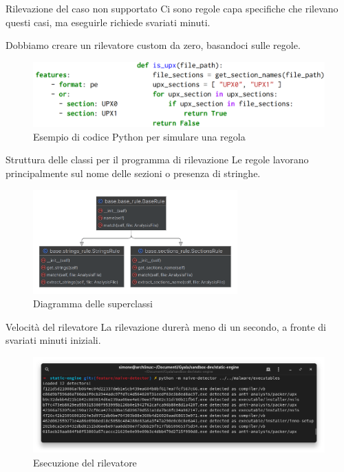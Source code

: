 \begin{frame}{Rilevazione del caso non supportato}
Ci sono regole capa specifiche che rilevano questi casi, ma eseguirle richiede svariati minuti.

Dobbiamo creare un rilevatore custom da zero, basandoci sulle regole.

\begin{figure}
    \centering
    \includegraphics[width=\textwidth]{images/capa_detector_rule.png}
    \caption{Esempio di codice Python per simulare una regola}
    \label{fig:capa_detector_rule}
\end{figure}
\end{frame}

\begin{frame}{Struttura delle classi per il programma di rilevazione}
Le regole lavorano principalmente sul nome delle sezioni o presenza di stringhe.

\begin{figure}
    \centering
    \includegraphics[width=0.7\textwidth]{images/base_custom_static_analyzer.png}
    \caption{Diagramma delle superclassi}
    \label{fig:base_custom_static_analyzer}
\end{figure}
\end{frame}

\begin{frame}{Velocità del rilevatore}
La rilevazione durerà meno di un secondo, a fronte di svariati minuti iniziali.

\begin{figure}
    \centering
    \includegraphics[width=\textwidth]{images/custom_file_detector_output.png}
    \caption{Esecuzione del rilevatore}
    \label{fig:custom_file_detector_output}
\end{figure}
\end{frame}

